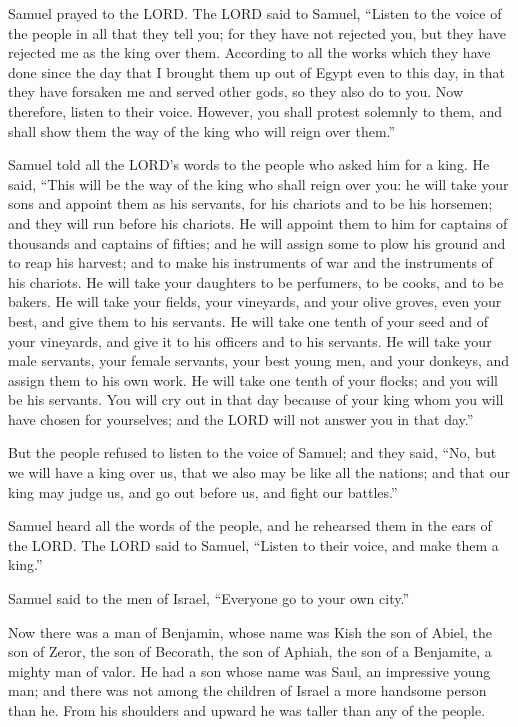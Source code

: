 Samuel prayed to the LORD.
\myverse{}The LORD said to Samuel, “Listen to the voice of the people in all that they
tell you; for they have not rejected you, but they have rejected me as the king over them.
\myverse{}According to all the works which they have done since the day that I brought
them up out of Egypt even to this day, in that they have forsaken me and served other gods, so they also
do to you.
\myverse{}Now therefore, listen to their voice. However, you shall protest solemnly to
them, and shall show them the way of the king who will reign over them.”

\myverse{}Samuel told all the LORD’s words to the people who asked him
for a king.
\myverse{}He said, “This will be the way of the king who shall reign over you: he will
take your sons and appoint them as his servants, for his chariots and to be his horsemen; and they will
run before his chariots.
\myverse{}He will appoint them to him for captains of thousands and captains of fifties;
and he will assign some to plow his ground and to reap his harvest; and to make his instruments of war
and the instruments of his chariots.
\myverse{}He will take your daughters to be perfumers, to be cooks, and to be bakers.
\myverse{}He will take your fields, your vineyards, and your olive groves, even your
best, and give them to his servants.
\myverse{}He will take one tenth of your seed and of your vineyards, and give it to
his officers and to his servants.
\myverse{}He will take your male servants, your female servants, your best young men,
and your donkeys, and assign them to his own work.
\myverse{}He will take one tenth of your flocks; and you will be his servants.
\myverse{}You will cry out in that day because of your king whom you will have chosen
for yourselves; and the LORD will not answer you in that day.”

\myverse{}But the people refused to listen to the voice of Samuel; and
they said, “No, but we will have a king over us,
\myverse{}that we also may be like all the nations; and that our king may judge us,
and go out before us, and fight our battles.”

\myverse{}Samuel heard all the words of the people, and he rehearsed them
in the ears of the LORD.
\myverse{}The LORD said to Samuel, “Listen to their voice, and make them a king.”

Samuel said to the men of Israel, “Everyone go to your own city.”


\mychapter{} \myverse*{}Now there was a man of Benjamin, whose name was Kish the son of
Abiel, the son of Zeror, the son of Becorath, the son of Aphiah, the son of a Benjamite, a mighty man
of valor.
\myverse{}He had a son whose name was Saul, an impressive young man; and there was not
among the children of Israel a more handsome person than he. From his shoulders and upward he was taller
than any of the people.

